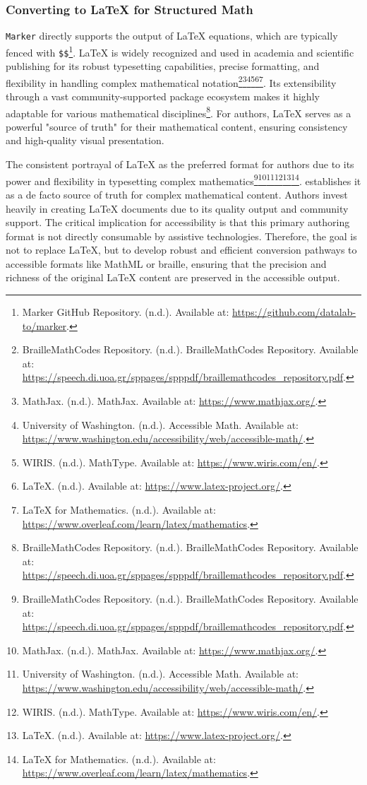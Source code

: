\subsubsection{Converting to LaTeX for Structured Math}
\texttt{Marker} directly supports the output of LaTeX equations, which are typically fenced with \texttt{\$\$}\footnote{Marker GitHub Repository. (n.d.). Available at: \url{https://github.com/datalab-to/marker}.}. LaTeX is widely recognized and used in academia and scientific publishing for its robust typesetting capabilities, precise formatting, and flexibility in handling complex mathematical notation\footnote{BrailleMathCodes Repository. (n.d.). BrailleMathCodes Repository. Available at: \url{https://speech.di.uoa.gr/sppages/spppdf/braillemathcodes_repository.pdf}.}\footnote{MathJax. (n.d.). MathJax. Available at: \url{https://www.mathjax.org/}.}\footnote{University of Washington. (n.d.). Accessible Math. Available at: \url{https://www.washington.edu/accessibility/web/accessible-math/}.}\footnote{WIRIS. (n.d.). MathType. Available at: \url{https://www.wiris.com/en/}.}\footnote{LaTeX. (n.d.). Available at: \url{https://www.latex-project.org/}.}\footnote{LaTeX for Mathematics. (n.d.). Available at: \url{https://www.overleaf.com/learn/latex/mathematics}.}. Its extensibility through a vast community-supported package ecosystem makes it highly adaptable for various mathematical disciplines\footnote{BrailleMathCodes Repository. (n.d.). BrailleMathCodes Repository. Available at: \url{https://speech.di.uoa.gr/sppages/spppdf/braillemathcodes_repository.pdf}.}. For authors, LaTeX serves as a powerful "source of truth" for their mathematical content, ensuring consistency and high-quality visual presentation.

The consistent portrayal of LaTeX as the preferred format for authors due to its power and flexibility in typesetting complex mathematics\footnote{BrailleMathCodes Repository. (n.d.). BrailleMathCodes Repository. Available at: \url{https://speech.di.uoa.gr/sppages/spppdf/braillemathcodes_repository.pdf}.}\footnote{MathJax. (n.d.). MathJax. Available at: \url{https://www.mathjax.org/}.}\footnote{University of Washington. (n.d.). Accessible Math. Available at: \url{https://www.washington.edu/accessibility/web/accessible-math/}.}\footnote{WIRIS. (n.d.). MathType. Available at: \url{https://www.wiris.com/en/}.}\footnote{LaTeX. (n.d.). Available at: \url{https://www.latex-project.org/}.}\footnote{LaTeX for Mathematics. (n.d.). Available at: \url{https://www.overleaf.com/learn/latex/mathematics}.}. establishes it as a de facto source of truth for complex mathematical content. Authors invest heavily in creating LaTeX documents due to its quality output and community support. The critical implication for accessibility is that this primary authoring format is not directly consumable by assistive technologies. Therefore, the goal is not to replace LaTeX, but to develop robust and efficient conversion pathways to accessible formats like MathML or braille, ensuring that the precision and richness of the original LaTeX content are preserved in the accessible output.

